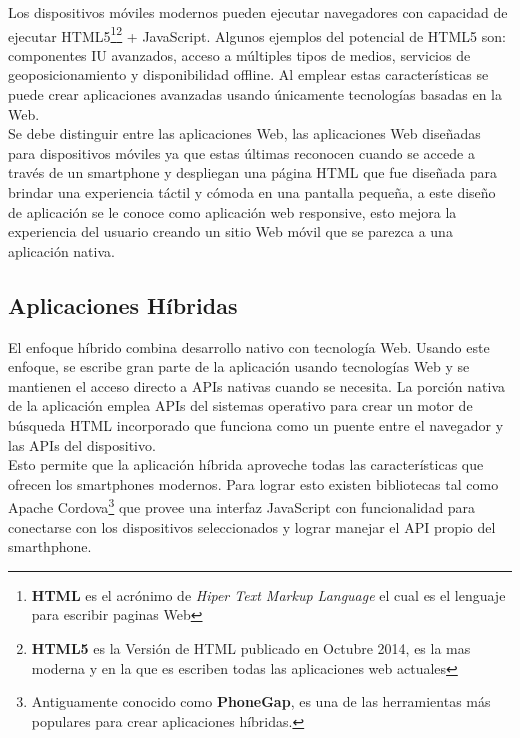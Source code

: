     Los dispositivos móviles modernos pueden ejecutar navegadores con capacidad de ejecutar HTML5\footnote{\textbf{HTML} es el acrónimo de \emph{Hiper Text Markup Language} el cual es el lenguaje para escribir paginas Web}\footnote{\textbf{HTML5} es la Versión de HTML publicado en Octubre 2014, es la mas moderna y en la que es escriben todas las aplicaciones web actuales} + JavaScript. Algunos ejemplos del potencial de HTML5 son: componentes IU avanzados, acceso a múltiples tipos de medios, servicios de geoposicionamiento y disponibilidad offline. Al emplear estas características se puede crear aplicaciones avanzadas usando únicamente tecnologías basadas en la Web.\\

    Se debe distinguir entre las aplicaciones Web, las aplicaciones Web diseñadas para dispositivos móviles ya que estas últimas reconocen cuando se accede a través de un smartphone y despliegan una página HTML que fue diseñada para brindar una experiencia táctil y cómoda en una pantalla pequeña, a este diseño de aplicación se le conoce como aplicación web responsive, esto mejora la experiencia del usuario creando un sitio Web móvil que se parezca a una aplicación nativa.\\


    \subsection{Aplicaciones Híbridas}
    \label{sub:aplicaciones_hibridas}

      El enfoque híbrido combina desarrollo nativo con tecnología Web. Usando este enfoque, se escribe gran parte de la aplicación usando tecnologías Web y se mantienen el acceso directo a APIs nativas cuando se necesita. La porción nativa de la aplicación emplea APIs del sistemas operativo para crear un motor de búsqueda HTML incorporado que funciona como un puente entre el navegador y las APIs del dispositivo\cite{IBM_Mobile}.\\

      Esto permite que la aplicación híbrida aproveche todas las características que ofrecen los smartphones modernos. Para lograr esto existen bibliotecas tal como Apache Cordova\footnote{Antiguamente conocido como \textbf{PhoneGap}, es una de las herramientas más populares para crear aplicaciones híbridas.} que provee una interfaz JavaScript con funcionalidad para conectarse con los dispositivos seleccionados y lograr manejar el API propio del smarthphone.\\

